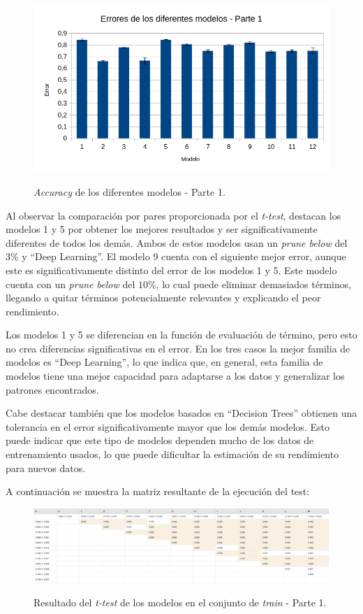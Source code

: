 \documentclass[es]{uc3mreport}
\begin{document}
\begin{report}
    \begin{figure}[H]
        \center
        \includegraphics[width=0.85\linewidth]{errors_train1.png}\\
        \caption{\textit{Accuracy} de los diferentes modelos - Parte 1.}
    \end{figure}

    Al observar la comparación por pares proporcionada por el \textit{t-test},
    destacan los modelos 1 y 5 por obtener los mejores resultados y ser significativamente
    diferentes de todos los demás. Ambos de estos modelos usan un \textit{prune below}
    del $3\%$ y ``Deep Learning''. El modelo 9 cuenta con el siguiente mejor error,
    aunque este es significativamente distinto del error de los modelos 1 y 5. Este
    modelo cuenta con un \textit{prune below} del $10\%$, lo cual puede eliminar
    demasiados términos, llegando a quitar términos potencialmente relevantes y
    explicando el peor rendimiento.

    Los modelos 1 y 5 se diferencian en la función de evaluación de término, pero
    esto no crea diferencias significativas en el error. En los tres casos la mejor
    familia de modelos es ``Deep Learning'', lo que indica que, en general, esta
    familia de modelos tiene una mejor capacidad para adaptarse a los datos y
    generalizar los patrones encontrados.

    Cabe destacar también que los modelos basados en ``Decision Trees'' obtienen
    una tolerancia en el error significativamente mayor que los demás modelos.
    Esto puede indicar que este tipo de modelos dependen mucho de los datos de
    entrenamiento usados, lo que puede dificultar la estimación de su rendimiento
    para nuevos datos.

    A continuación se muestra la matriz resultante de la ejecución del test:

    \begin{figure}[H]
        \center
        \includegraphics[width=\linewidth]{t_test1.jpeg}\\
        \caption{Resultado del \textit{t-test} de los modelos en el conjunto de
        \textit{train} - Parte 1.}
    \end{figure}


\end{report}
\end{document}
